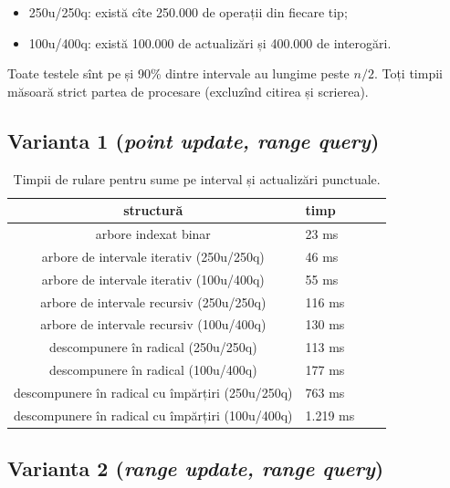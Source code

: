 \documentclass[../main.tex]{subfiles}
\begin{document}
\begin{itemize}
  \item 250u/250q: există cîte 250.000 de operații din fiecare tip;
  \item 100u/400q: există 100.000 de actualizări și 400.000 de interogări.
\end{itemize}

Toate testele sînt pe  și 90\% dintre intervale au lungime peste $n/2$. Toți timpii măsoară strict partea de procesare (excluzînd citirea și scrierea).

\subsection{Varianta 1 (\textit{point update, range query})}

\begin{table}[!htbp]
  \centering
  \begin{tabular}{SlSr}
    \textbf{structură} & \textbf{timp} \\
    \hline
    arbore indexat binar & 23 ms \\
    arbore de intervale iterativ (250u/250q) & 46 ms \\
    arbore de intervale iterativ (100u/400q) & 55 ms \\
    arbore de intervale recursiv (250u/250q) & 116 ms \\
    arbore de intervale recursiv (100u/400q) & 130 ms \\
    descompunere în radical (250u/250q) & 113 ms \\
    descompunere în radical (100u/400q) & 177 ms \\
    descompunere în radical cu împărțiri (250u/250q) & 763 ms \\
    descompunere în radical cu împărțiri (100u/400q) & 1.219 ms \\
    \hline
  \end{tabular}

  \caption{Timpii de rulare pentru sume pe interval și actualizări punctuale.}
\end{table}

\subsection{Varianta 2 (\textit{range update, range query})}
\end{document}
